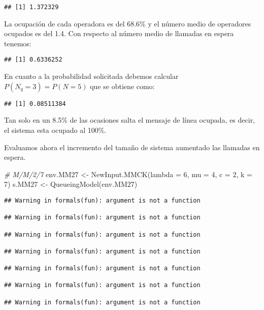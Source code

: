 \documentclass[
]{book}
\newenvironment{Shaded}{\begin{snugshade}}{\end{snugshade}}
\newcommand{\AttributeTok}[1]{\textcolor[rgb]{0.77,0.63,0.00}{#1}}
\newcommand{\CommentTok}[1]{\textcolor[rgb]{0.56,0.35,0.01}{\textit{#1}}}
\newcommand{\DecValTok}[1]{\textcolor[rgb]{0.00,0.00,0.81}{#1}}
\newcommand{\FunctionTok}[1]{\textcolor[rgb]{0.00,0.00,0.00}{#1}}
\newcommand{\NormalTok}[1]{#1}
\newcommand{\OtherTok}[1]{\textcolor[rgb]{0.56,0.35,0.01}{#1}}
\newcommand{\SpecialCharTok}[1]{\textcolor[rgb]{0.00,0.00,0.00}{#1}}
\theoremstyle{definition}
\theoremstyle{definition}
\theoremstyle{definition}
\theoremstyle{definition}
\theoremstyle{remark}
\begin{document}
\begin{verbatim}
## [1] 1.372329
\end{verbatim}

La ocupación de cada operadora es del 68.6\% y el número medio de operadores ocupados es del 1.4. Con respecto al número medio de llamadas en espera tenemos:

\begin{Shaded}
\end{Shaded}

\begin{verbatim}
## [1] 0.6336252
\end{verbatim}

En cuanto a la probabilidad solicitada debemos calcular \(P(N_q = 3) = P(N = 5)\) que se obtiene como:

\begin{Shaded}
\end{Shaded}

\begin{verbatim}
## [1] 0.08511384
\end{verbatim}

Tan solo en un 8.5\% de las ocasiones salta el mensaje de línea ocupada, es decir, el sistema esta ocupado al 100\%.

Evaluamos ahora el incremento del tamaño de sistema aumentado las llamadas en espera.

\begin{Shaded}
\begin{Highlighting}[]
\CommentTok{\# M/M/2/7}
\NormalTok{env.MM27 }\OtherTok{\textless{}{-}} \FunctionTok{NewInput.MMCK}\NormalTok{(}\AttributeTok{lambda =} \DecValTok{6}\NormalTok{, }\AttributeTok{mu =} \DecValTok{4}\NormalTok{, }\AttributeTok{c =} \DecValTok{2}\NormalTok{, }\AttributeTok{k =} \DecValTok{7}\NormalTok{)}
\NormalTok{s.MM27 }\OtherTok{\textless{}{-}} \FunctionTok{QueueingModel}\NormalTok{(env.MM27)}
\end{Highlighting}
\end{Shaded}

\begin{verbatim}
## Warning in formals(fun): argument is not a function

## Warning in formals(fun): argument is not a function

## Warning in formals(fun): argument is not a function

## Warning in formals(fun): argument is not a function

## Warning in formals(fun): argument is not a function

## Warning in formals(fun): argument is not a function

## Warning in formals(fun): argument is not a function
\end{verbatim}
\end{document}
